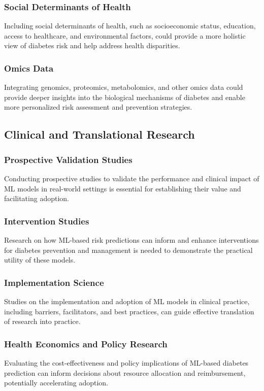 \documentclass[journal]{IEEEtran}
\begin{document}
\subsubsection{Social Determinants of Health}
Including social determinants of health, such as socioeconomic status, education, access to healthcare, and environmental factors, could provide a more holistic view of diabetes risk and help address health disparities.

\subsubsection{Omics Data}
Integrating genomics, proteomics, metabolomics, and other omics data could provide deeper insights into the biological mechanisms of diabetes and enable more personalized risk assessment and prevention strategies.

\subsection{Clinical and Translational Research}
\subsubsection{Prospective Validation Studies}
Conducting prospective studies to validate the performance and clinical impact of ML models in real-world settings is essential for establishing their value and facilitating adoption.

\subsubsection{Intervention Studies}
Research on how ML-based risk predictions can inform and enhance interventions for diabetes prevention and management is needed to demonstrate the practical utility of these models.

\subsubsection{Implementation Science}
Studies on the implementation and adoption of ML models in clinical practice, including barriers, facilitators, and best practices, can guide effective translation of research into practice.

\subsubsection{Health Economics and Policy Research}
Evaluating the cost-effectiveness and policy implications of ML-based diabetes prediction can inform decisions about resource allocation and reimbursement, potentially accelerating adoption.
\end{document}
